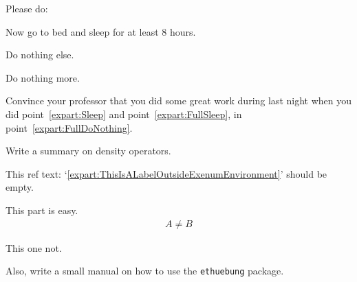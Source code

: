 \documentclass[11pt,a4paper]{article}
\begin{document}
\begin{exenumerate} %
\item \exenumfull\label{expart:FullDoNothing}
  Please do:
  \begin{exenumerate}
  \item \label{expart:Sleep}
    Now go to bed and sleep for at least 8 hours.
  \item \exenumfull\label{expart:FullSleep}
    Do nothing else.
  \item Do nothing more.
  \end{exenumerate}

\item Convince your professor that you did some great work during last night when you did
  point~\ref{expart:Sleep} and point~\ref{expart:FullSleep}, in
  point~\ref{expart:FullDoNothing}.

\item Write a summary on density operators.

\end{exenumerate}

This ref text: `\ref{expart:ThisIsALabelOutsideExenumEnvironment}' should be empty.

\begin{loesung}
  \begin{exenumerate}
  \item This part is easy.
    \begin{align}
      A \neq B
    \end{align}
  \item This one not.
  \end{exenumerate}
\end{loesung}



\begin{exenumerate}
\item Also, write a small manual on how to use the \texttt{ethuebung} package.
\end{exenumerate}

\end{document}
